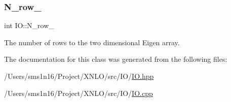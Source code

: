 \subsubsection{\texorpdfstring{N\_row\_}{N\_row\_}}
{\footnotesize\ttfamily int I\+O\+::\+N\+\_\+row\+\_\+}

The number of rows to the two dimensional Eigen array. 

The documentation for this class was generated from the following files\+:\begin{DoxyCompactItemize}
\item 
/\+Users/sms1n16/\+Project/\+X\+N\+L\+O/src/\+I\+O/\mbox{\hyperlink{_i_o_8hpp}{I\+O.\+hpp}}\item 
/\+Users/sms1n16/\+Project/\+X\+N\+L\+O/src/\+I\+O/\mbox{\hyperlink{_i_o_8cpp}{I\+O.\+cpp}}\end{DoxyCompactItemize}
